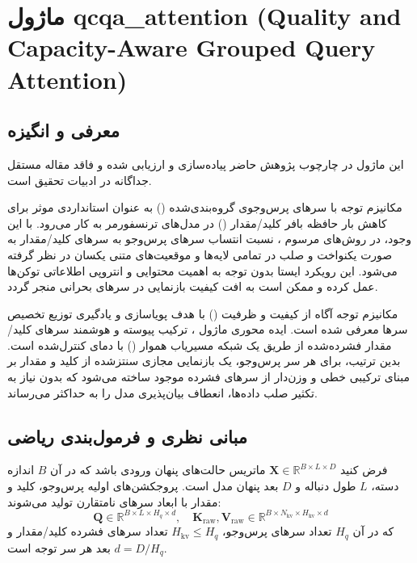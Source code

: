 \section{ماژول qcqa\_attention (Quality and Capacity-Aware Grouped Query Attention)}
\label{sec:module_qcqa_attention}

\subsection{معرفی و انگیزه}
این ماژول در چارچوب پژوهش حاضر پیاده‌سازی و ارزیابی شده و فاقد مقاله مستقل جداگانه در ادبیات تحقیق است.

مکانیزم توجه با سرهای پرس‌وجوی گروه‌بندی‌شده () به عنوان استانداردی موثر برای کاهش بار حافظه بافر کلید/مقدار () در مدل‌های ترنسفورمر به کار می‌رود. با این وجود، در روش‌های مرسوم ، نسبت انتساب سرهای پرس‌وجو به سرهای کلید/مقدار به صورت یکنواخت و صلب در تمامی لایه‌ها و موقعیت‌های متنی یکسان در نظر گرفته می‌شود. این رویکرد ایستا بدون توجه به اهمیت محتوایی و انتروپی اطلاعاتی توکن‌ها عمل کرده و ممکن است به افت کیفیت بازنمایی در سرهای بحرانی منجر گردد.

مکانیزم توجه آگاه از کیفیت و ظرفیت () با هدف پویاسازی و یادگیری توزیع تخصیص سرها معرفی شده است. ایده محوری ماژول ، ترکیب پیوسته و هوشمند سرهای کلید/مقدار فشرده‌شده از طریق یک شبکه مسیریاب هموار () با دمای کنترل‌شده است. بدین ترتیب، برای هر سر پرس‌وجو، یک بازنمایی مجازی سنتز‌شده از کلید و مقدار بر مبنای ترکیبی خطی و وزن‌دار از سرهای فشرده موجود ساخته می‌شود که بدون نیاز به تکثیر صلب داده‌ها، انعطاف بیان‌پذیری مدل را به حداکثر می‌رساند.

\subsection{مبانی نظری و فرمول‌بندی ریاضی}
فرض کنید $\mathbf{X} \in \mathbb{R}^{B \times L \times D}$ ماتریس حالت‌های پنهان ورودی باشد که در آن $B$ اندازه دسته، $L$ طول دنباله و $D$ بعد پنهان مدل است. پروجکشن‌های اولیه پرس‌وجو، کلید و مقدار با ابعاد سرهای نامتقارن تولید می‌شوند:
\begin{equation}
\mathbf{Q} \in \mathbb{R}^{B \times L \times H_q \times d}, \quad \mathbf{K}_{\text{raw}}, \mathbf{V}_{\text{raw}} \in \mathbb{R}^{B \times N_{\text{kv}} \times H_{\text{kv}} \times d}
\end{equation}
که در آن $H_q$ تعداد سرهای پرس‌وجو، $H_{\text{kv}} \le H_q$ تعداد سرهای فشرده کلید/مقدار و $d = D / H_q$ بعد هر سر توجه است.

